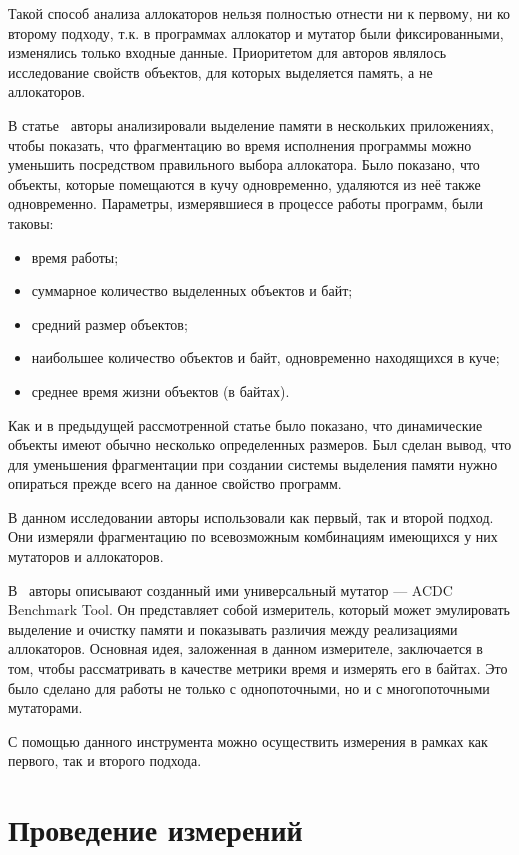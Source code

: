 Такой способ анализа аллокаторов нельзя полностью отнести ни к первому, ни ко второму подходу, т.к. в программах аллокатор и мутатор
были фиксированными, изменялись только входные данные. Приоритетом для авторов являлось исследование свойств объектов, для которых выделяется
память, а не аллокаторов.
   
В статье~\cite{fragm} авторы анализировали выделение памяти в нескольких приложениях, чтобы показать, что фрагментацию
во время исполнения программы можно уменьшить посредством правильного выбора аллокатора. Было показано, что объекты,
которые помещаются в кучу одновременно, удаляются из неё также одновременно. 
Параметры, измерявшиеся в процессе работы программ, были таковы:
   
\begin{itemize}
\item время работы;
\item суммарное количество выделенных объектов и байт;
\item средний размер объектов;
\item наибольшее количество объектов и байт, одновременно находящихся в куче;
\item среднее время жизни объектов (в байтах).
\end{itemize}
   
Как и в предыдущей рассмотренной статье было показано, что динамические объекты имеют обычно несколько определенных размеров. Был сделан
вывод, что для уменьшения фрагментации при создании системы выделения памяти нужно опираться прежде всего на данное свойство программ.
   
В данном исследовании авторы использовали как первый, так и второй подход. Они измеряли фрагментацию по всевозможным комбинациям имеющихся 
у них мутаторов и аллокаторов.
   
В~\cite{un_mutator} авторы описывают созданный ими универсальный мутатор --- ACDC Benchmark Tool. Он представляет собой измеритель, 
который может эмулировать выделение и очистку памяти и показывать различия между реализациями аллокаторов. Основная идея, заложенная в данном 
измерителе, заключается в том, чтобы рассматривать в качестве метрики время и измерять его в байтах. Это было сделано для работы не только с
однопоточными, но и с многопоточными мутаторами. 
   
С помощью данного инструмента можно осуществить измерения в рамках как первого, так и второго подхода.
  
   
\section{Проведение измерений}

